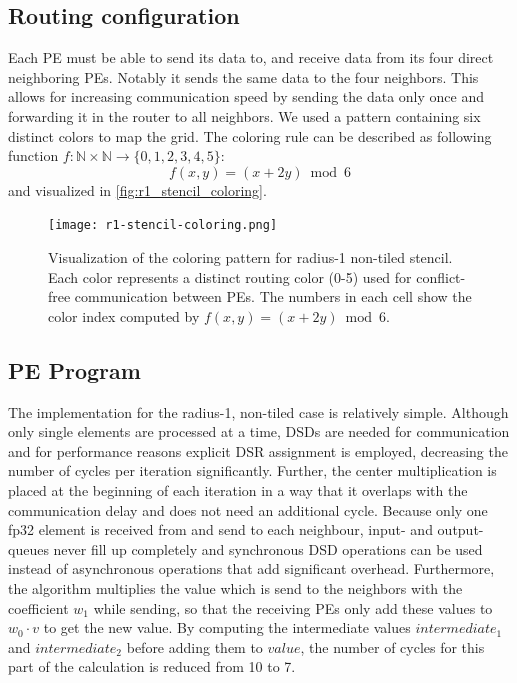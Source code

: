\subsection{Routing configuration}
Each PE must be able to send its data to, and receive data from its four direct neighboring PEs. Notably it sends the same data to the four neighbors. This allows for increasing communication speed by sending the data only once and forwarding it in the router to all neighbors. We used a pattern containing six distinct colors to map the grid.
The coloring rule can be described as following function $f:\mathbb{N}\times\mathbb{N}\to\{0,1,2,3,4,5\}$:
\begin{equation}
    \label{eq:coloring_function}
    f(x,y) = (x + 2y) \bmod 6
\end{equation}
and visualized in \autoref{fig:r1_stencil_coloring}.
\begin{figure}
    \centering
    \texttt{[image: r1-stencil-coloring.png]}
    \caption{Visualization of the coloring pattern for radius-1 non-tiled stencil. Each color represents a distinct routing color (0-5) used for conflict-free communication between PEs. The numbers in each cell show the color index computed by $f(x,y) = (x + 2y) \bmod 6$.}
    \label{fig:r1_stencil_coloring}
\end{figure}

\subsection{PE Program}
The implementation for the radius-1, non-tiled case is relatively simple.
Although only single elements are processed at a time, DSDs are needed for communication and for performance reasons explicit DSR assignment is employed, decreasing the number of cycles per iteration significantly.  
Further, the center multiplication is placed at the beginning of each iteration in a way that it overlaps with the communication delay and does not need an additional cycle.
Because only one fp32 element is received from and send to each neighbour, input- and output- queues never fill up completely and synchronous DSD operations can be used instead of asynchronous operations that add significant overhead.
Furthermore, the algorithm multiplies the value which is send to the neighbors with the coefficient $w_1$ while sending, so that the receiving PEs only add these values to $w_0 \cdot v$ to get the new value.
By computing the intermediate values $intermediate_1$ and $intermediate_2$ before adding them to $value$, the number of cycles for this part of the calculation is reduced from 10 to 7.

